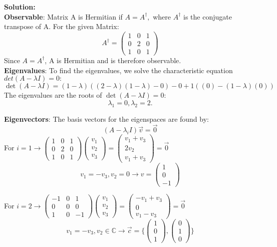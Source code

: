 \documentclass{article}
\theoremstyle{plain}
\numberwithin{thm}{section}
\theoremstyle{definition}
\begin{document}
\begin{enumerate}
    \textbf{Solution:}\\
    \textbf{Observable}: Matrix A is Hermitian if $A=A^\dagger,$ where $A^\dagger$ is the conjugate transpose of A. For the given Matrix:  $$A^\dagger = \begin{pmatrix}
    1 & 0 & 1 \\
    0 & 2 & 0 \\
    1 & 0 & 1
    \end{pmatrix}$$ Since $A = A^\dagger$, A is Hermitian and is therefore observable.\\
    
    \textbf{Eigenvalues}: To find the eigenvalues, we solve the characteristic equation $det(A-\lambda I)=0:$ $$\det(A - \lambda I) = (1-\lambda)((2-\lambda)(1-\lambda) - 0) - 0 + 1((0) - (1-\lambda)(0))$$
    The eigenvalues are the roots of $\det(A-\lambda I)=0:$ $$\lambda_1 =0, \lambda_2 = 2.$$

    \textbf{Eigenvectors}: The basis vectors for the eigenspaces are found by: $$(A-\lambda_i I)\vec{v}=\vec{0}$$
    For $i = 1 \rightarrow \begin{pmatrix}
    1 & 0 & 1 \\
    0 & 2 & 0 \\
    1 & 0 & 1
    \end{pmatrix}
    \begin{pmatrix}
    v_1 \\
    v_2 \\
    v_3
    \end{pmatrix} =
    \begin{pmatrix}
    v_1 + v_3 \\
    2v_2 \\
    v_1 + v_3
    \end{pmatrix} = \vec{0}$ $$v_1=-v_3,v_2=0 \rightarrow v = \begin{pmatrix} 1\\0\\-1\end{pmatrix}$$

    For $i=2 \rightarrow \begin{pmatrix}
    -1 & 0 & 1 \\
    0 & 0 & 0 \\
    1 & 0 & -1
    \end{pmatrix}
    \begin{pmatrix}
    v_1 \\
    v_2 \\
    v_3
    \end{pmatrix} =
    \begin{pmatrix}
    -v_1 + v_3 \\
    0 \\
    v_1 - v_3
    \end{pmatrix} = \vec{0}$ $$v_1=-v_3,v_2 \in \mathbb{C} \rightarrow \vec{c} =\{ \begin{pmatrix} 1\\0\\1\end{pmatrix}, \begin{pmatrix} 0\\1\\0\end{pmatrix}\}$$


\end{enumerate}
\end{document}
